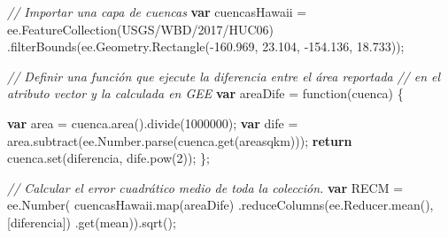 \documentclass[
  12pt,
  letterpaper,
  twoside]{book}
\newenvironment{Shaded}{\begin{snugshade}}{\end{snugshade}}
\newcommand{\AttributeTok}[1]{\textcolor[rgb]{0.48,0.12,0.64}{#1}}
\newcommand{\CommentTok}[1]{\textcolor[rgb]{0.24,0.58,0.00}{\textit{#1}}}
\newcommand{\ControlFlowTok}[1]{\textcolor[rgb]{0.00,0.00,0.00}{\textbf{#1}}}
\newcommand{\DecValTok}[1]{\textcolor[rgb]{0.28,0.53,0.93}{#1}}
\newcommand{\FloatTok}[1]{\textcolor[rgb]{0.28,0.53,0.93}{#1}}
\newcommand{\FunctionTok}[1]{\textcolor[rgb]{0.48,0.12,0.64}{#1}}
\newcommand{\KeywordTok}[1]{\textcolor[rgb]{0.48,0.12,0.64}{#1}}
\newcommand{\NormalTok}[1]{#1}
\newcommand{\OperatorTok}[1]{\textcolor[rgb]{0.00,0.00,0.00}{#1}}
\newcommand{\StringTok}[1]{\textcolor[rgb]{0.87,0.29,0.22}{#1}}
\begin{document}
\begin{Shaded}
\begin{Highlighting}[]
\CommentTok{// Importar una capa de cuencas}
\ControlFlowTok{var}\NormalTok{ cuencasHawaii }\OperatorTok{=} \KeywordTok{ee}\OperatorTok{.}\FunctionTok{FeatureCollection}\NormalTok{(}\StringTok{\textquotesingle{}USGS/WBD/2017/HUC06\textquotesingle{}}\NormalTok{)}
  \OperatorTok{.}\FunctionTok{filterBounds}\NormalTok{(}\KeywordTok{ee}\OperatorTok{.}\AttributeTok{Geometry}\OperatorTok{.}\FunctionTok{Rectangle}\NormalTok{(}\OperatorTok{{-}}\FloatTok{160.969}\OperatorTok{,} \FloatTok{23.104}\OperatorTok{,} \OperatorTok{{-}}\FloatTok{154.136}\OperatorTok{,} \FloatTok{18.733}\NormalTok{))}\OperatorTok{;}

\CommentTok{// Definir una función que ejecute la diferencia entre el área reportada }
\CommentTok{// en el atributo vector y la calculada en GEE}
\ControlFlowTok{var}\NormalTok{ areaDife }\OperatorTok{=} \KeywordTok{function}\NormalTok{(cuenca) \{}
 
  \ControlFlowTok{var}\NormalTok{ area }\OperatorTok{=}\NormalTok{ cuenca}\OperatorTok{.}\FunctionTok{area}\NormalTok{()}\OperatorTok{.}\FunctionTok{divide}\NormalTok{(}\DecValTok{1000000}\NormalTok{)}\OperatorTok{;}
  \ControlFlowTok{var}\NormalTok{ dife }\OperatorTok{=}\NormalTok{ area}\OperatorTok{.}\FunctionTok{subtract}\NormalTok{(}\KeywordTok{ee}\OperatorTok{.}\AttributeTok{Number}\OperatorTok{.}\FunctionTok{parse}\NormalTok{(cuenca}\OperatorTok{.}\FunctionTok{get}\NormalTok{(}\StringTok{\textquotesingle{}areasqkm\textquotesingle{}}\NormalTok{)))}\OperatorTok{;}
  \ControlFlowTok{return}\NormalTok{ cuenca}\OperatorTok{.}\FunctionTok{set}\NormalTok{(}\StringTok{\textquotesingle{}diferencia\textquotesingle{}}\OperatorTok{,}\NormalTok{ dife}\OperatorTok{.}\FunctionTok{pow}\NormalTok{(}\DecValTok{2}\NormalTok{))}\OperatorTok{;}
\NormalTok{\}}\OperatorTok{;}

\CommentTok{// Calcular el error cuadrático medio de toda la colección.}
\ControlFlowTok{var}\NormalTok{ RECM }\OperatorTok{=} \KeywordTok{ee}\OperatorTok{.}\FunctionTok{Number}\NormalTok{(}
\NormalTok{  cuencasHawaii}\OperatorTok{.}\FunctionTok{map}\NormalTok{(areaDife)}
  \OperatorTok{.}\FunctionTok{reduceColumns}\NormalTok{(}\KeywordTok{ee}\OperatorTok{.}\AttributeTok{Reducer}\OperatorTok{.}\FunctionTok{mean}\NormalTok{()}\OperatorTok{,}\NormalTok{ [}\StringTok{\textquotesingle{}diferencia\textquotesingle{}}\NormalTok{])}
  \OperatorTok{.}\FunctionTok{get}\NormalTok{(}\StringTok{\textquotesingle{}mean\textquotesingle{}}\NormalTok{))}\OperatorTok{.}\FunctionTok{sqrt}\NormalTok{()}\OperatorTok{;}
\end{Highlighting}
\end{Shaded}
\end{document}
